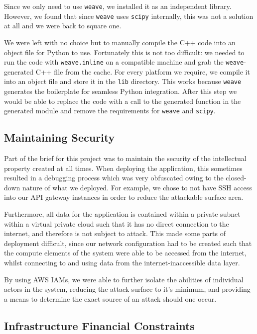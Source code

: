 Since we only need to use \texttt{weave}, we installed it as an independent library. However, we found that since \texttt{weave} uses \texttt{scipy} internally, this was not a solution at all and we were back to square one.

We were left with no choice but to manually compile the C++ code into an object file for Python to use. Fortunately this is not too difficult: we needed to run the code with \texttt{weave.inline} on a compatible machine and grab the \texttt{weave}-generated C++ file from the cache. For every platform we require, we compile it into an object file and store it in the \texttt{lib} directory. This works because \texttt{weave} generates the boilerplate for seamless Python integration. After this step we would be able to replace the code with a call to the generated function in the generated module and remove the requirements for \texttt{weave} and \texttt{scipy}.

\subsection{Maintaining Security}

Part of the brief for this project was to maintain the security of the intellectual property created at all times. When deploying the application, this sometimes resulted in a debugging process which was very obfuscated owing to the closed-down nature of what we deployed. For example, we chose to not have SSH access into our API gateway instances in order to reduce the attackable surface area.

Furthermore, all data for the application is contained within a private subnet within a virtual private cloud such that it has no direct connection to the internet, and therefore is not subject to attack. This made some parts of deployment difficult, since our network configuration had to be created such that the compute elements of the system were able to be accessed from the internet, whilst connecting to and using data from the internet-inaccessible data layer.

By using AWS IAMs, we were able to further isolate the abilities of individual actors in the system, reducing the attack surface to it's minimum, and providing a means to determine the exact source of an attack should one occur.

\subsection{Infrastructure Financial Constraints}

